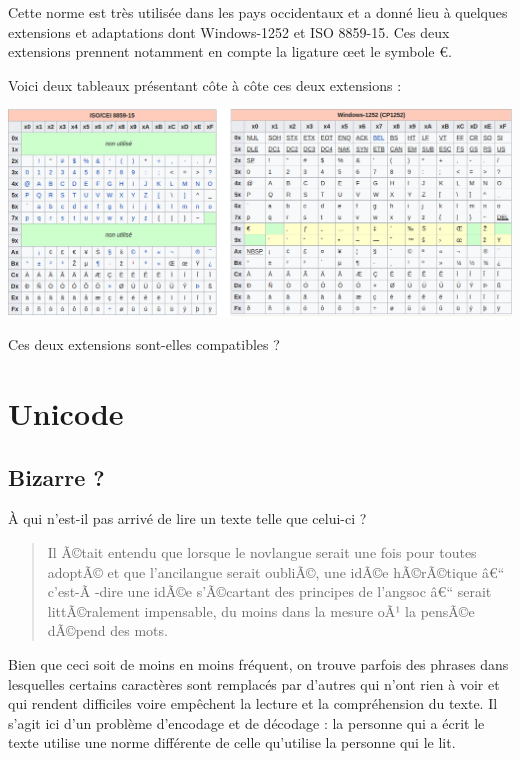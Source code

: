 \documentclass[a4paper,dvipsnames]{article}
\begin{document}
\smallskip

Cette norme est très utilisée dans les pays occidentaux et a donné lieu à quelques extensions et adaptations dont Windows-1252 et ISO 8859-15. Ces deux extensions prennent notamment en compte la ligature \oe et le symbole €.

\smallskip

Voici deux tableaux présentant côte à côte ces deux extensions :

\begin{center}
  \includegraphics[width=17cm]{img/extensions.png}
\end{center}

\medskip

\begin{exercice}{}{}
  Ces deux extensions sont-elles compatibles ?
\end{exercice}

\section{Unicode}

\subsection{Bizarre ?}

À qui n'est-il pas arrivé de lire un texte telle que celui-ci ?

\begin{quote}
  Il Ã©tait entendu que lorsque le novlangue serait une fois pour toutes adoptÃ© et que l'ancilangue serait oubliÃ©, une idÃ©e hÃ©rÃ©tique â€“ c'est-Ã -dire une idÃ©e s'Ã©cartant des principes de l'angsoc â€“ serait littÃ©ralement impensable, du moins dans la mesure oÃ¹ la pensÃ©e dÃ©pend des mots.
\end{quote}

Bien que ceci soit de moins en moins fréquent, on trouve parfois des phrases dans lesquelles certains caractères sont remplacés par d'autres qui n'ont rien à voir et qui rendent difficiles voire empêchent la lecture et la compréhension du texte. Il s'agit ici d'un problème d'encodage et de décodage : la personne qui a écrit le texte utilise une norme différente de celle qu'utilise la personne qui le lit.
\end{document}
